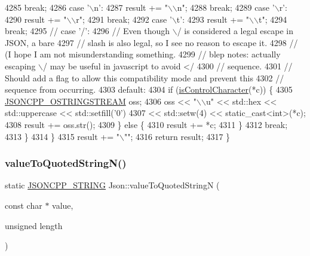 \begin{DoxyCode}
4285       \textcolor{keywordflow}{break};
4286     \textcolor{keywordflow}{case} \textcolor{charliteral}{'\(\backslash\)n'}:
4287       result += \textcolor{stringliteral}{"\(\backslash\)\(\backslash\)n"};
4288       \textcolor{keywordflow}{break};
4289     \textcolor{keywordflow}{case} \textcolor{charliteral}{'\(\backslash\)r'}:
4290       result += \textcolor{stringliteral}{"\(\backslash\)\(\backslash\)r"};
4291       \textcolor{keywordflow}{break};
4292     \textcolor{keywordflow}{case} \textcolor{charliteral}{'\(\backslash\)t'}:
4293       result += \textcolor{stringliteral}{"\(\backslash\)\(\backslash\)t"};
4294       \textcolor{keywordflow}{break};
4295     \textcolor{comment}{// case '/':}
4296     \textcolor{comment}{// Even though \(\backslash\)/ is considered a legal escape in JSON, a bare}
4297     \textcolor{comment}{// slash is also legal, so I see no reason to escape it.}
4298     \textcolor{comment}{// (I hope I am not misunderstanding something.}
4299     \textcolor{comment}{// blep notes: actually escaping \(\backslash\)/ may be useful in javascript to avoid </}
4300     \textcolor{comment}{// sequence.}
4301     \textcolor{comment}{// Should add a flag to allow this compatibility mode and prevent this}
4302     \textcolor{comment}{// sequence from occurring.}
4303     \textcolor{keywordflow}{default}:
4304       \textcolor{keywordflow}{if} (\hyperlink{namespace_json_a0381e631737f51331065a388f4f59197}{isControlCharacter}(*c)) \{
4305         \hyperlink{json_8h_a1d06ac2ca63c8c521f41231dfda0e6b3}{JSONCPP\_OSTRINGSTREAM} oss;
4306         oss << \textcolor{stringliteral}{"\(\backslash\)\(\backslash\)u"} << std::hex << std::uppercase << std::setfill(\textcolor{charliteral}{'0'})
4307             << std::setw(4) << \textcolor{keyword}{static\_cast<}\textcolor{keywordtype}{int}\textcolor{keyword}{>}(*c);
4308         result += oss.str();
4309       \} \textcolor{keywordflow}{else} \{
4310         result += *c;
4311       \}
4312       \textcolor{keywordflow}{break};
4313     \}
4314   \}
4315   result += \textcolor{stringliteral}{"\(\backslash\)""};
4316   \textcolor{keywordflow}{return} result;
4317 \}
\end{DoxyCode}
\mbox{\label{namespace_json_a29aff81733b8fdaabf3f1acfc3ad339f}} 
\subsubsection{\texorpdfstring{value\+To\+Quoted\+String\+N()}{valueToQuotedStringN()}}
{\footnotesize\ttfamily static \hyperlink{json_8h_a1e723f95759de062585bc4a8fd3fa4be}{J\+S\+O\+N\+C\+P\+P\+\_\+\+S\+T\+R\+I\+NG} Json\+::value\+To\+Quoted\+StringN (\begin{DoxyParamCaption}\item[{const char $\ast$}]{value,  }\item[{unsigned}]{length }\end{DoxyParamCaption})\hspace{0.3cm}{\ttfamily [static]}}




